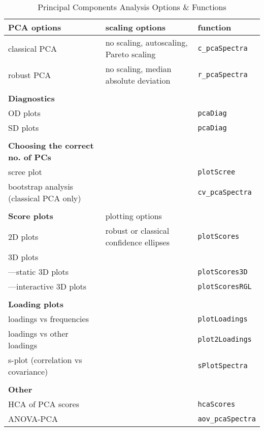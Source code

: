 \documentclass[letter,10pt,twocolumn,twoside,printwatermark=false]{pinp}
\begin{document}
\begin{table*}
\caption{Principal Components Analysis Options \& Functions}
\label{opt}
\begin{center}
\begin{tabular}{|ll|l|}
\hline
\textbf{PCA options} & scaling options & function\\
\hline
classical PCA &  no scaling, autoscaling, Pareto scaling & \texttt{c\_pcaSpectra} \\
robust PCA & no scaling, median absolute deviation & \texttt{r\_pcaSpectra} \\
&&\\
\textbf{Diagnostics} &  & \\
\hline
OD plots & & \texttt{pcaDiag} \\
SD plots & & \texttt{pcaDiag}\\
&&\\
\textbf{Choosing the correct no. of PCs} & & \\
\hline
scree plot & & \texttt{plotScree}\\
bootstrap analysis (classical PCA only) & & \texttt{cv\_pcaSpectra} \\
&&\\

\textbf{Score plots} & plotting options &  \\
\hline
2D plots & robust or classical confidence ellipses & \texttt{plotScores} \\
3D plots && \\
---static 3D plots & & \texttt{plotScores3D}\\
---interactive 3D plots & & \texttt{plotScoresRGL}\\
&&\\
\textbf{Loading plots} & & \\
\hline
loadings vs frequencies & & \texttt{plotLoadings} \\
loadings vs other loadings & & \texttt{plot2Loadings} \\
s-plot (correlation vs covariance) & & \texttt{sPlotSpectra} \\
&&\\
\hline
\textbf{Other} &&\\
HCA of PCA scores & & \texttt{hcaScores} \\
ANOVA-PCA & & \texttt{aov\_pcaSpectra} \\
\hline
\end{tabular}
\end{center}
\end{table*}
\end{document}
